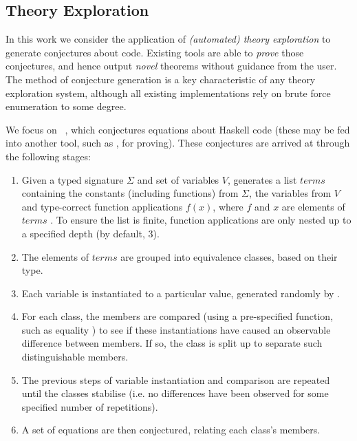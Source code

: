 \subsection{Theory Exploration}
\label{sec:theoryexploration}

In this work we consider the application of \emph{(automated) theory
  exploration} to generate conjectures about code. Existing tools are able to
\emph{prove} those conjectures, and hence output \emph{novel} theorems without
guidance from the user. The method of conjecture generation is a key
characteristic of any theory exploration system, although all existing
implementations rely on brute force enumeration to some degree.

We focus on \qspec{}~\cite{QuickSpec}, which conjectures equations about
Haskell code (these may be fed into another tool, such as \hspec{}, for
proving). These conjectures are arrived at through the following stages:

\iffalse TODO: Make this more formal?
 V \in Var
 F \in Fun
 T \in Term
 T ::= V | F | T1 T2

 Term ::= VAR | Const | Fun (Term)
or
 Term t ::= x | f | t t'
\fi

\begin{enumerate}
\item Given a typed signature $\Sigma$ and set of variables $V$, \qspec{}
  generates a list $terms$ containing the constants (including functions) from
  $\Sigma$, the variables from $V$ and type-correct function applications
  $f(x)$, where $f$ and $x$ are elements of $terms$ \iffalse TODO: A little
  awkward; maybe use the above notation? \fi. To ensure the list is finite,
  function applications are only nested up to a specified depth (by default, 3).
\item The elements of $terms$ are grouped into equivalence classes, based on
  their type.
\item Each variable is instantiated to a particular value, generated randomly by
  \qcheck{}.
\item For each class, the members are compared (using a pre-specified function,
  such as equality \hs{==}) to see if these instantiations have caused an
  observable difference between members. If so, the class is split up to
  separate such distinguishable members.
\item The previous steps of variable instantiation and comparison are repeated
  until the classes stabilise (i.e. no differences have been observed for some
  specified number of repetitions).
\item A set of equations are then conjectured, relating each class's members.
\end{enumerate}

